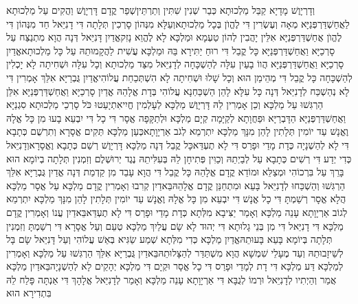 \documentclass[../main/main.tex]{subfiles}
\begin{document}
\begin{multicols*}{\ncols}
וְדָרְיָוֶשׁ מָדָיָא קַבֵּל מַלְכוּתָא כְּבַר שְׁנִין שִׁתִּין וְתַרְתֵּין\PreVerseSpace{}שְׁפַר קֳדָם דָּרְיָוֶשׁ וַהֲקִים עַל מַלְכוּתָא לַאֲחַשְׁדַּרְפְּנַיָּא מְאָה וְעֶשְׂרִין דִּי לֶהֱוֺן בְּכָל מַלְכוּתָא\PreVerseSpace{}וְעֵלָּא מִנְּהוֹן סָרְכִין תְּלָתָה דִּי דָנִיֵּאל חַד מִנְּהוֹן דִּי לֶהֱוֺן אֲחַשְׁדַּרְפְּנַיָּא אִלֵּין יָהֲבִין לְהוֹן טַעְמָא וּמַלְכָּא לָא לֶהֱוֵא נָזִק\PreVerseSpace{}אֱדַיִן דָּנִיֵּאל דְּנָה הֲוָא מִתְנַצַּח עַל סָרְכַיָּא וַאֲחַשְׁדַּרְפְּנַיָּא כָּל קֳבֵל דִּי רוּחַ יַתִּירָא בֵּהּ וּמַלְכָּא עֲשִׁית לַהֲקָמוּתֵהּ עַל כָּל מַלְכוּתָא\PreVerseSpace{}אֱדַיִן סָרְכַיָּא וַאֲחַשְׁדַּרְפְּנַיָּא הֲווֹ בָעַיִן עִלָּה לְהַשְׁכָּחָה לְדָנִיֵּאל מִצַּד מַלְכוּתָא וְכָל עִלָּה וּשְׁחִיתָה לָא יָכְלִין לְהַשְׁכָּחָה כָּל קֳבֵל דִּי מְהֵימַן הוּא וְכָל שָׁלוּ וּשְׁחִיתָה לָא הִשְׁתְּכַחַת עֲלוֹהִי\PreVerseSpace{}אֱדַיִן גֻּבְרַיָּא אִלֵּךְ אָמְרִין דִּי לָא נְהַשְׁכַּח לְדָנִיֵּאל דְּנָה כָּל עִלָּא לָהֵן הַשְׁכַּחְנָא עֲלוֹהִי בְּדָת אֱלָהֵהּ \ClosedSection{}אֱדַיִן סָרְכַיָּא וַאֲחַשְׁדַּרְפְּנַיָּא אִלֵּן הַרְגִּשׁוּ עַל מַלְכָּא וְכֵן אָמְרִין לֵהּ דָּרְיָוֶשׁ מַלְכָּא לְעָלְמִין חֱיִי\PreVerseSpace{}אִתְיָעַטוּ כֹּל סָרְכֵי מַלְכוּתָא סִגְנַיָּא וַאֲחַשְׁדַּרְפְּנַיָּא הַדָּבְרַיָּא וּפַחֲוָתָא לְקַיָּמָה קְיָם מַלְכָּא וּלְתַקָּפָה אֱסָר דִּי כָל דִּי יִבְעֵא בָעוּ מִן כָּל אֱלָהּ וֶאֱנָשׁ עַד יוֹמִין תְּלָתִין לָהֵן מִנָּךְ מַלְכָּא יִתְרְמֵא לְגֹב אַרְיָוָתָא\PreVerseSpace{}כְּעַן מַלְכָּא תְּקִים אֱסָרָא וְתִרְשֻׁם כְּתָבָא דִּי לָא לְהַשְׁנָיָה כְּדָת מָדַי וּפָרַס דִּי לָא תֶעְדֵּא\PreVerseSpace{}כָּל קֳבֵל דְּנָה מַלְכָּא דָּרְיָוֶשׁ רְשַׁם כְּתָבָא וֶאֱסָרָא\PreVerseSpace{}וְדָנִיֵּאל כְּדִי יְדַע דִּי רְשִׁים כְּתָבָא עַל לְבַיְתֵהּ וְכַוִּין פְּתִיחָן לֵהּ בְּעִלִּיתֵהּ נֶגֶד יְרוּשְׁלֶם וְזִמְנִין תְּלָתָה בְיוֹמָא הוּא בָּרֵךְ עַל בִּרְכוֹהִי וּמְצַלֵּא וּמוֹדֵא קֳדָם אֱלָהֵהּ כָּל קֳבֵל דִּי הֲוָא עָבֵד מִן קַדְמַת דְּנָה \ClosedSection{}אֱדַיִן גֻּבְרַיָּא אִלֵּךְ הַרְגִּשׁוּ וְהַשְׁכַּחוּ לְדָנִיֵּאל בָּעֵא וּמִתְחַנַּן קֳדָם אֱלָהֵהּ\PreVerseSpace{}בֵּאדַיִן קְרִבוּ וְאָמְרִין קֳדָם מַלְכָּא עַל אֱסָר מַלְכָּא הֲלָא אֱסָר רְשַׁמְתָּ דִּי כָל אֱנָשׁ דִּי יִבְעֵא מִן כָּל אֱלָהּ וֶאֱנָשׁ עַד יוֹמִין תְּלָתִין לָהֵן מִנָּךְ מַלְכָּא יִתְרְמֵא לְגוֹב אַרְיָוָתָא עָנֵה מַלְכָּא וְאָמַר יַצִּיבָא מִלְּתָא כְּדָת מָדַי וּפָרַס דִּי לָא תֶעְדֵּא\PreVerseSpace{}בֵּאדַיִן עֲנוֹ וְאָמְרִין קֳדָם מַלְכָּא דִּי דָנִיֵּאל דִּי מִן בְּנֵי גָלוּתָא דִּי יְהוּד לָא שָׂם עֲלַיִךְ מַלְכָּא טְעֵם וְעַל אֱסָרָא דִּי רְשַׁמְתָּ וְזִמְנִין תְּלָתָה בְּיוֹמָא בָּעֵא בָּעוּתֵהּ\PreVerseSpace{}אֱדַיִן מַלְכָּא כְּדִי מִלְּתָא שְׁמַע שַׂגִּיא בְּאֵשׁ עֲלוֹהִי וְעַל דָּנִיֵּאל שָׂם בָּל לְשֵׁיזָבוּתֵהּ וְעַד מֶעָלֵי שִׁמְשָׁא הֲוָא מִשְׁתַּדַּר לְהַצָּלוּתֵהּ\PreVerseSpace{}בֵּאדַיִן גֻּבְרַיָּא אִלֵּךְ הַרְגִּשׁוּ עַל מַלְכָּא וְאָמְרִין לְמַלְכָּא דַּע מַלְכָּא דִּי דָת לְמָדַי וּפָרַס דִּי כָל אֱסָר וּקְיָם דִּי מַלְכָּא יְהָקֵים לָא לְהַשְׁנָיָה\PreVerseSpace{}בֵּאדַיִן מַלְכָּא אֲמַר וְהַיְתִיו לְדָנִיֵּאל וּרְמוֹ לְגֻבָּא דִּי אַרְיָוָתָא עָנֵה מַלְכָּא וְאָמַר לְדָנִיֵּאל אֱלָהָךְ דִּי אַנְתָּה פָּלַח לֵהּ בִּתְדִירָא הוּא 
\end{multicols*}
\end{document}
